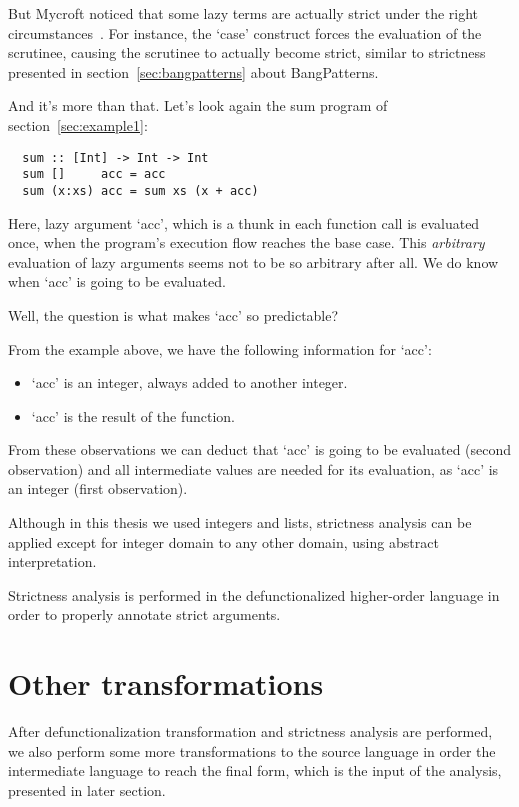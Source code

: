\documentclass[diploma]{softlab-thesis}
\begin{document}
But Mycroft
noticed that some lazy terms are actually strict under the right circumstances~\cite{Mycroft:1980:TPT:647324.721526}. For instance, the `case' 
construct forces the evaluation of the scrutinee, causing the scrutinee to actually become strict, 
similar to strictness presented in section~\ref{sec:bangpatterns} about BangPatterns. 

And it's more than that. Let's look again the sum program of section~\ref{sec:example1}:
\begin{verbatim}
  sum :: [Int] -> Int -> Int
  sum []     acc = acc
  sum (x:xs) acc = sum xs (x + acc)
\end{verbatim}

Here, lazy argument `acc', which is a thunk in each function call is evaluated once, when the program's 
execution flow reaches the base case. This \textit{arbitrary} evaluation of lazy arguments seems not to 
be so arbitrary after all. We do know when `acc' is going to be evaluated.
\newline
\par Well, the question is what makes `acc' so predictable? 

From the example above, we have the following information for `acc':
\begin{itemize}
  \item `acc' is an integer, always added to another integer.
  \item `acc' is the result of the function.
\end{itemize}

From these observations we can deduct that `acc' is going to be evaluated (second observation) and 
all intermediate values are needed for its evaluation, as `acc' is an integer (first observation).
\newline
\par Although in this thesis we used integers and lists, strictness analysis can be applied except for 
integer domain to any other domain, using abstract interpretation.
\newline
\par Strictness analysis is performed in the defunctionalized higher-order language in order to 
properly annotate strict arguments.

\section {Other transformations}
\label{sec:other-transformations}

After defunctionalization transformation and strictness analysis are performed, we also 
perform some more transformations to the source language in order the intermediate 
language to reach the final form, which is the input of the analysis, presented in later section.
\end{document}

